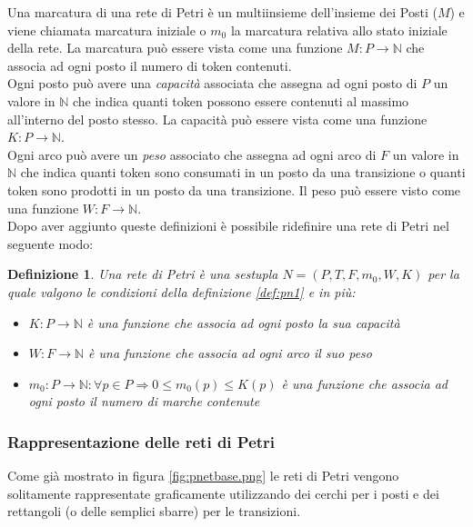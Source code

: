 \documentclass[italian,12pt]{book}
\newtheorem{mydef}{Definizione}
\begin{document}
Una marcatura di una rete di Petri è un multiinsieme dell'insieme dei
Posti ($M$) e viene chiamata marcatura iniziale o $m_0$ la marcatura
relativa allo stato iniziale della rete. La marcatura può essere vista
come una funzione $M : P \to \mathbb{N}$ che associa ad ogni posto il numero
di token contenuti.\\
Ogni posto può avere una \emph{capacità} associata che assegna ad ogni
posto di $P$ un valore in $\mathbb{N}$ che indica quanti token possono
essere contenuti al massimo all'interno del posto stesso. La capacità
può essere vista come una funzione $K : P \to \mathbb{N}$. \\
Ogni arco può avere un \emph{peso} associato che assegna ad ogni arco
di $F$ un valore in $\mathbb{N}$ che indica quanti token sono
consumati in un posto da una transizione o quanti token sono prodotti
in un posto da una transizione. Il peso può essere visto come una
funzione $W : F \to \mathbb{N}$. \\
Dopo aver aggiunto queste definizioni è possibile ridefinire una rete
di Petri nel seguente modo:
\begin{mydef}
Una rete di Petri è una sestupla $N = (P,T,F,m_0,W,K)$ per la quale
valgono le condizioni della definizione \ref{def:pn1} e in più:
\begin{itemize}
\item $K : P \to \mathbb{N}$ è una funzione che associa ad ogni posto
  la sua capacità
\item $W : F \to \mathbb{N}$ è una funzione che associa ad ogni arco
  il suo peso
\item $m_0 : P \to \mathbb{N} : \forall p \in P \Rightarrow 0 \leq m_0(p)
  \leq K(p)$ è una funzione che associa ad ogni posto il numero di
  marche contenute
\end{itemize}
\end{mydef}

\subsubsection{Rappresentazione delle reti di Petri}
Come già mostrato in figura \ref{fig:pnetbase.png} le reti di Petri
vengono solitamente rappresentate graficamente utilizzando dei cerchi
per i posti e dei rettangoli (o delle semplici sbarre) per le transizioni.
\end{document}

